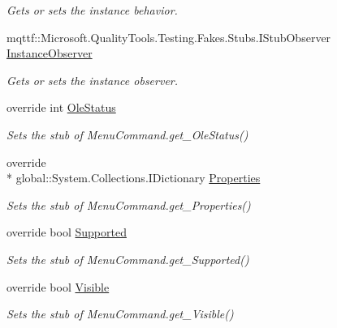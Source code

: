 \begin{DoxyCompactItemize}
\begin{DoxyCompactList}\small\item\em Gets or sets the instance behavior.\end{DoxyCompactList}\item 
mqttf\-::\-Microsoft.\-Quality\-Tools.\-Testing.\-Fakes.\-Stubs.\-I\-Stub\-Observer \hyperlink{class_system_1_1_component_model_1_1_design_1_1_fakes_1_1_stub_designer_verb_a3ad40852163e2e4d2d11cd1edfb53970}{Instance\-Observer}
\begin{DoxyCompactList}\small\item\em Gets or sets the instance observer.\end{DoxyCompactList}\item 
override int \hyperlink{class_system_1_1_component_model_1_1_design_1_1_fakes_1_1_stub_designer_verb_a8215b230ea4187d2fa92d72a82df1977}{Ole\-Status}
\begin{DoxyCompactList}\small\item\em Sets the stub of Menu\-Command.\-get\-\_\-\-Ole\-Status()\end{DoxyCompactList}\item 
override \\*
global\-::\-System.\-Collections.\-I\-Dictionary \hyperlink{class_system_1_1_component_model_1_1_design_1_1_fakes_1_1_stub_designer_verb_ac5adb68d81c817795c922f625a7f659e}{Properties}
\begin{DoxyCompactList}\small\item\em Sets the stub of Menu\-Command.\-get\-\_\-\-Properties()\end{DoxyCompactList}\item 
override bool \hyperlink{class_system_1_1_component_model_1_1_design_1_1_fakes_1_1_stub_designer_verb_aea3ce5fd794e8dd37cfdcfcc61d5028a}{Supported}
\begin{DoxyCompactList}\small\item\em Sets the stub of Menu\-Command.\-get\-\_\-\-Supported()\end{DoxyCompactList}\item 
override bool \hyperlink{class_system_1_1_component_model_1_1_design_1_1_fakes_1_1_stub_designer_verb_a681a5dee750b417a92dcedb8d2d46900}{Visible}
\begin{DoxyCompactList}\small\item\em Sets the stub of Menu\-Command.\-get\-\_\-\-Visible()\end{DoxyCompactList}\end{DoxyCompactItemize}


